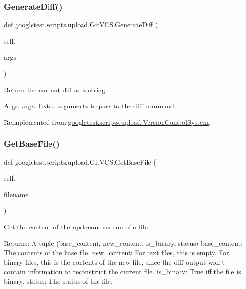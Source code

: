\subsubsection{\texorpdfstring{GenerateDiff()}{GenerateDiff()}}
{\footnotesize\ttfamily def googletest.\+scripts.\+upload.\+Git\+V\+C\+S.\+Generate\+Diff (\begin{DoxyParamCaption}\item[{}]{self,  }\item[{}]{args }\end{DoxyParamCaption})}

\begin{DoxyVerb}Return the current diff as a string.

Args:
  args: Extra arguments to pass to the diff command.
\end{DoxyVerb}
 

Reimplemented from \mbox{\hyperlink{classgoogletest_1_1scripts_1_1upload_1_1_version_control_system_aaada7d567809eca22e4a9ddd377429fe}{googletest.\+scripts.\+upload.\+Version\+Control\+System}}.

\mbox{\label{classgoogletest_1_1scripts_1_1upload_1_1_git_v_c_s_ac9fcd4827b37346353ea602106399f07}} 
\subsubsection{\texorpdfstring{GetBaseFile()}{GetBaseFile()}}
{\footnotesize\ttfamily def googletest.\+scripts.\+upload.\+Git\+V\+C\+S.\+Get\+Base\+File (\begin{DoxyParamCaption}\item[{}]{self,  }\item[{}]{filename }\end{DoxyParamCaption})}

\begin{DoxyVerb}Get the content of the upstream version of a file.

Returns:
  A tuple (base_content, new_content, is_binary, status)
base_content: The contents of the base file.
new_content: For text files, this is empty.  For binary files, this is
  the contents of the new file, since the diff output won't contain
  information to reconstruct the current file.
is_binary: True iff the file is binary.
status: The status of the file.
\end{DoxyVerb}
 

